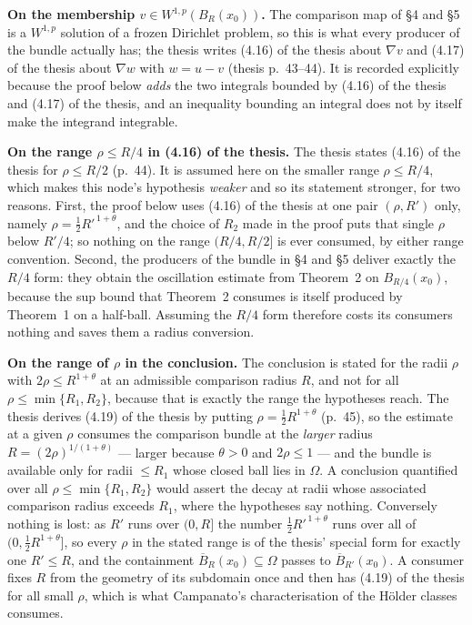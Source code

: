 \begin{helper}
\noindent\textbf{On the membership $v\in W^{1,p}(B_R(x_0))$.}  The comparison
map of \S4 and \S5 is a $W^{1,p}$ solution of a frozen Dirichlet problem, so
this is what every producer of the bundle actually has; the thesis writes
(4.16) of the thesis about $\nabla v$ and (4.17) of the thesis about $\nabla w$ with
$w=u-v$ (thesis p.~43--44).  It is recorded explicitly because the proof below
\emph{adds} the two integrals bounded by (4.16) of the thesis and (4.17) of the thesis,
and an inequality bounding an integral does not by itself make the integrand
integrable.

\noindent\textbf{On the range $\rho\le R/4$ in (4.16) of the thesis.}  The thesis
states (4.16) of the thesis for $\rho\le R/2$ (p.~44).  It is assumed here on the
smaller range $\rho\le R/4$, which makes this node's hypothesis \emph{weaker}
and so its statement stronger, for two reasons.  First, the proof below uses
(4.16) of the thesis at one pair $(\rho,R')$ only, namely
$\rho=\frac12R'^{\,1+\theta}$, and the choice of $R_2$ made in the proof puts
that single $\rho$ below $R'/4$; so nothing on the range $(R/4,R/2]$ is ever
consumed, by either range convention.  Second, the producers of the bundle in
\S4 and \S5 deliver exactly the $R/4$ form: they obtain the oscillation
estimate from Theorem~2 on $B_{R/4}(x_0)$, because the sup bound that
Theorem~2 consumes is itself produced by Theorem~1 on a half-ball.  Assuming
the $R/4$ form therefore costs its consumers nothing and saves them a radius
conversion.

\noindent\textbf{On the range of $\rho$ in the conclusion.}  The conclusion is
stated for the radii $\rho$ with $2\rho\le R^{1+\theta}$ at an admissible
comparison radius $R$, and not for all $\rho\le\min\{R_1,R_2\}$, because that is
exactly the range the hypotheses reach.  The thesis derives (4.19) of the thesis by
putting $\rho=\frac12R^{1+\theta}$ (p.~45), so the estimate at a given $\rho$
consumes the comparison bundle at the \emph{larger} radius
$R=(2\rho)^{1/(1+\theta)}$ --- larger because $\theta>0$ and $2\rho\le1$ --- and
the bundle is available only for radii $\le R_1$ whose closed ball lies in
$\Omega$.  A conclusion quantified over all $\rho\le\min\{R_1,R_2\}$ would
assert the decay at radii whose associated comparison radius exceeds $R_1$,
where the hypotheses say nothing.  Conversely nothing is lost: as $R'$ runs over
$(0,R]$ the number $\frac12R'^{\,1+\theta}$ runs over all of
$(0,\frac12R^{1+\theta}]$, so every $\rho$ in the stated range is of the thesis'
special form for exactly one $R'\le R$, and the containment
$\overline B_R(x_0)\subseteq\Omega$ passes to $\overline B_{R'}(x_0)$.  A
consumer fixes $R$ from the geometry of its subdomain once and then has
(4.19) of the thesis for all small $\rho$, which is what Campanato's
characterisation of the H\"older classes consumes.
\end{helper}
